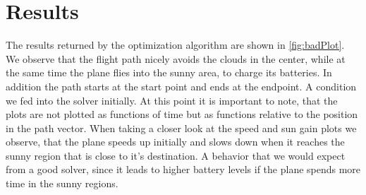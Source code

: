 \section{Results}
The results returned by the optimization algorithm are shown in \ref{fig:badPlot}. We observe that the flight path nicely avoids the clouds in the center, while at the same time the plane flies into the sunny area, to charge its batteries. In addition the path starts at the start point and ends at the endpoint. A condition we fed into the solver initially. 
At this point it is important to note, that the plots are not plotted as functions of time but as functions relative to the position in the path vector. When taking a closer look at the speed and sun gain plots we observe, that the plane speeds up initially and slows down when it reaches the sunny region that is close to it's destination. A behavior that we would expect from a good solver, since it leads to higher battery levels if the plane spends more time in the sunny regions.

